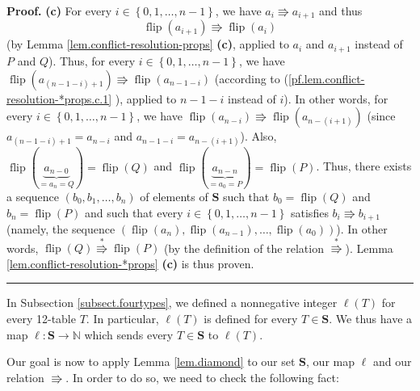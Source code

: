 \documentclass[numbers=enddot,12pt,final,onecolumn,notitlepage]{scrartcl}%
\theoremstyle{definition}
\newenvironment{proof}[1][Proof]{\noindent\textbf{#1.} }{\ \rule{0.5em}{0.5em}}
\newenvironment{verlong}{}{}
\begin{document}
\begin{verlong}
\begin{proof}
\textbf{(c)} For every $i\in\left\{  0,1,\ldots,n-1\right\}  $, we have
$a_{i}\Rrightarrow a_{i+1}$ and thus
\begin{equation}
\operatorname*{flip}\left(  a_{i+1}\right)  \Rrightarrow\operatorname*{flip}%
\left(  a_{i}\right)  \label{pf.lem.conflict-resolution-*props.c.1}%
\end{equation}
(by Lemma \ref{lem.conflict-resolution-props} \textbf{(c)}, applied to $a_{i}$
and $a_{i+1}$ instead of $P$ and $Q$). Thus, for every $i\in\left\{
0,1,\ldots,n-1\right\}  $, we have $\operatorname*{flip}\left(  a_{\left(
n-1-i\right)  +1}\right)  \Rrightarrow\operatorname*{flip}\left(
a_{n-1-i}\right)  $ (according to (\ref{pf.lem.conflict-resolution-*props.c.1}%
), applied to $n-1-i$ instead of $i$). In other words, for every $i\in\left\{
0,1,\ldots,n-1\right\}  $, we have $\operatorname*{flip}\left(  a_{n-i}%
\right)  \Rrightarrow\operatorname*{flip}\left(  a_{n-\left(  i+1\right)
}\right)  $ (since $a_{\left(  n-1-i\right)  +1}=a_{n-i}$ and $a_{n-1-i}%
=a_{n-\left(  i+1\right)  }$). Also, $\operatorname*{flip}\left(
\underbrace{a_{n-0}}_{=a_{n}=Q}\right)  =\operatorname*{flip}\left(  Q\right)
$ and $\operatorname*{flip}\left(  \underbrace{a_{n-n}}_{=a_{0}=P}\right)
=\operatorname*{flip}\left(  P\right)  $. Thus, there exists a sequence
$\left(  b_{0},b_{1},\ldots,b_{n}\right)  $ of elements of $\mathbf{S}$ such
that $b_{0}=\operatorname*{flip}\left(  Q\right)  $ and $b_{n}%
=\operatorname*{flip}\left(  P\right)  $ and such that every $i\in\left\{
0,1,\ldots,n-1\right\}  $ satisfies $b_{i}\Rrightarrow b_{i+1}$ (namely, the
sequence $\left(  \operatorname*{flip}\left(  a_{n}\right)
,\operatorname*{flip}\left(  a_{n-1}\right)  ,\ldots,\operatorname*{flip}%
\left(  a_{0}\right)  \right)  $). In other words, $\operatorname*{flip}%
\left(  Q\right)  \overset{\ast}{\Rrightarrow}\operatorname*{flip}\left(
P\right)  $ (by the definition of the relation $\overset{\ast}{\Rrightarrow}%
$). Lemma \ref{lem.conflict-resolution-*props} \textbf{(c)} is thus proven.
\end{proof}
\end{verlong}

In Subsection \ref{subsect.fourtypes}, we defined a nonnegative integer
$\ell\left(  T\right)  $ for every 12-table $T$. In particular, $\ell\left(
T\right)  $ is defined for every $T\in\mathbf{S}$. We thus have a map
$\ell:\mathbf{S}\rightarrow\mathbb{N}$ which sends every $T\in\mathbf{S}$ to
$\ell\left(  T\right)  $.

Our goal is now to apply Lemma \ref{lem.diamond} to our set $\mathbf{S}$, our
map $\ell$ and our relation $\Rrightarrow$. In order to do so, we need to
check the following fact:
\end{document}
